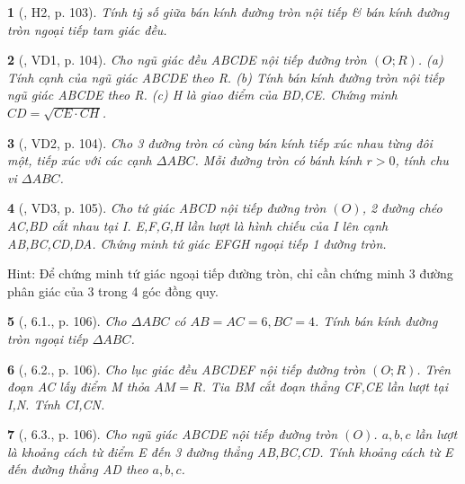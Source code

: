 \documentclass{article}
\newtheorem{baitoan}{}
\begin{document}
\begin{baitoan}[\cite{Binh_boi_duong_Toan_9_tap_2}, H2, p. 103]
	Tính tỷ số giữa bán kính đường tròn nội tiếp \& bán kính đường tròn ngoại tiếp tam giác đều.
\end{baitoan}

\begin{baitoan}[\cite{Binh_boi_duong_Toan_9_tap_2}, VD1, p. 104]
	Cho ngũ giác đều ABCDE nội tiếp đường tròn $(O;R)$. (a) Tính cạnh của ngũ giác ABCDE theo R. (b) Tính bán kính đường tròn nội tiếp ngũ giác ABCDE theo R. (c) H là giao điểm của BD,CE. Chứng minh $CD = \sqrt{CE\cdot CH}$.
\end{baitoan}

\begin{baitoan}[\cite{Binh_boi_duong_Toan_9_tap_2}, VD2, p. 104]
	Cho 3 đường tròn có cùng bán kính tiếp xúc nhau từng đôi một, tiếp xúc với các cạnh $\Delta ABC$. Mỗi đường tròn có bánh kính $r > 0$, tính chu vi $\Delta ABC$.
\end{baitoan}

\begin{baitoan}[\cite{Binh_boi_duong_Toan_9_tap_2}, VD3, p. 105]
	Cho tứ giác ABCD nội tiếp đường tròn $(O)$, 2 đường chéo AC,BD cắt nhau tại I. E,F,G,H lần lượt là hình chiếu của I lên cạnh AB,BC,CD,DA. Chứng minh tứ giác EFGH ngoại tiếp 1 đường tròn.
\end{baitoan}
{\sf Hint}: Để chứng minh tứ giác ngoại tiếp đường tròn, chỉ cần chứng minh 3 đường phân giác của 3 trong 4 góc đồng quy.

\begin{baitoan}[\cite{Binh_boi_duong_Toan_9_tap_2}, 6.1., p. 106]
	Cho $\Delta ABC$ có $AB = AC = 6,BC = 4$. Tính bán kính đường tròn ngoại tiếp $\Delta ABC$.
\end{baitoan}

\begin{baitoan}[\cite{Binh_boi_duong_Toan_9_tap_2}, 6.2., p. 106]
	Cho lục giác đều ABCDEF nội tiếp đường tròn $(O;R)$. Trên đoạn AC lấy điểm M thỏa $AM = R$. Tia BM cắt đoạn thẳng CF,CE lần lượt tại I,N. Tính CI,CN.
\end{baitoan}

\begin{baitoan}[\cite{Binh_boi_duong_Toan_9_tap_2}, 6.3., p. 106]
	Cho ngũ giác ABCDE nội tiếp đường tròn $(O)$. $a,b,c$ lần lượt là khoảng cách từ điểm E đến 3 đường thẳng AB,BC,CD. Tính khoảng cách từ E đến đường thẳng AD theo $a,b,c$.
\end{baitoan}
\end{document}
